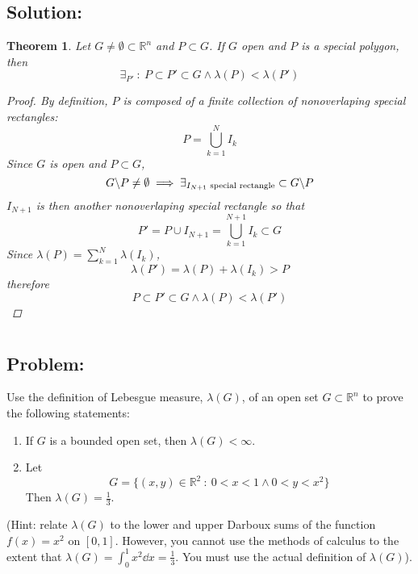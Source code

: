 \documentclass[]{article}
\newcommand{\R}{\mathbb{R}}
\newcommand{\st}{\ : \ }
\newtheorem{theorem}{Theorem}
\begin{document}
\subsection*{Solution:}
\begin{theorem}
    Let $G \neq \emptyset \subset \R^n$ and $P \subset G$.
    If $G$ open and $P$ is a special polygon, then \[
        \exists_{P'} \st P \subset P' \subset G \land \lambda(P) < \lambda(P')
    \]
    \begin{proof}
        By definition, $P$ is composed of a finite collection of nonoverlaping special rectangles:\[
            P = \bigcup_{k=1}^{N} I_k
        \] Since $G$ is open and $P \subset G$, \[
            G \backslash P \neq \emptyset \implies \exists_{I_{N+1} \textnormal{ special rectangle}} \subset G \backslash P
        \] $I_{N+1}$ is then another nonoverlaping special rectangle so that \[
            P' = P \cup I_{N+1} = \bigcup_{k=1}^{N+1} I_k \subset G
        \] Since $\lambda(P) = \sum_{k=1}^{N} \lambda(I_k)$, \[
            \lambda(P') = \lambda(P) + \lambda(I_k) > P
        \] therefore \[
            P \subset P' \subset G \land \lambda(P) < \lambda(P')
        \]
    \end{proof}
\end{theorem}

\newpage
\section{}
\subsection*{Problem:}
Use the definition of Lebesgue measure, $\lambda(G)$, of an open set $G \subset \R^n$ to prove the following statements: \begin{enumerate}
    \item If $G$ is a bounded open set, then $\lambda(G) < \infty$.
    \item Let \[
        G = \{
            (x,y) \in \R^2 \st 0 < x < 1 \land 0 < y < x^2
        \}
    \] Then $\lambda(G) = \frac{1}{3}$.
\end{enumerate}
(Hint: 
relate $\lambda(G)$ to the lower and upper Darboux sums of the function $f(x) = x^2$ on $[0,1]$. 
However, you cannot use the methods of calculus to the extent that $\lambda(G) = \int_0^1 x^2 \dd{x} = \frac{1}{3}$.
You must use the actual definition of $\lambda(G)$).
\end{document}
